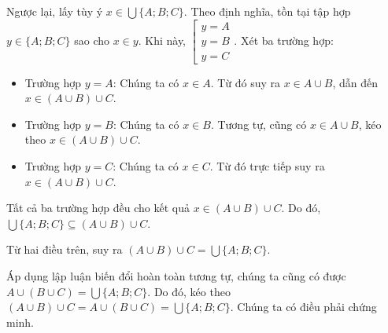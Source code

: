 Ngược lại, lấy tùy ý $x \in \bigcup \{A; B; C\}$. Theo định nghĩa, tồn tại tập hợp $y \in \{A; B; C\}$ sao cho $x \in y$. Khi này, $\left[\begin{array}{l}
      y = A \\
      y = B \\
      y = C
   \end{array}\right.$. Xét ba trường hợp:
\begin{itemize}
   \item \textcolor{colorEmphasis}{Trường hợp $y = A$}: Chúng ta có $x \in A$. Từ đó suy ra $x \in A \cup B$, dẫn đến $x \in (A \cup B) \cup C$.
   \item \textcolor{colorEmphasisCyan}{Trường hợp $y = B$}: Chúng ta có $x \in B$. Tương tự, cũng có $x \in A \cup B$, kéo theo $x \in (A \cup B) \cup C$.
   \item \textcolor{colorEmphasisGreen}{Trường hợp $y = C$}: Chúng ta có $x \in C$. Từ đó trực tiếp suy ra $x \in (A \cup B) \cup C$.
\end{itemize}
Tất cả ba trường hợp đều cho kết quả $x \in (A \cup B) \cup C$. Do đó, $\bigcup \{A; B; C\} \subseteq (A \cup B) \cup C$.

Từ hai điều trên, suy ra $(A \cup B) \cup C = \bigcup \{A; B; C\}$.

Áp dụng lập luận biến đổi hoàn toàn tương tự, chúng ta cũng có được $A \cup (B \cup C) = \bigcup \{A; B; C\}$. Do đó, kéo theo $(A \cup B) \cup C = A \cup (B \cup C) = \bigcup \{A; B; C\}$. Chúng ta có điều phải chứng minh.